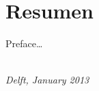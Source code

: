 \chapter*{Resumen}

Preface\ldots

\begin{flushright}
{\makeatletter\itshape
    \@author \\
    Delft, January 2013
\makeatother}
\end{flushright}


